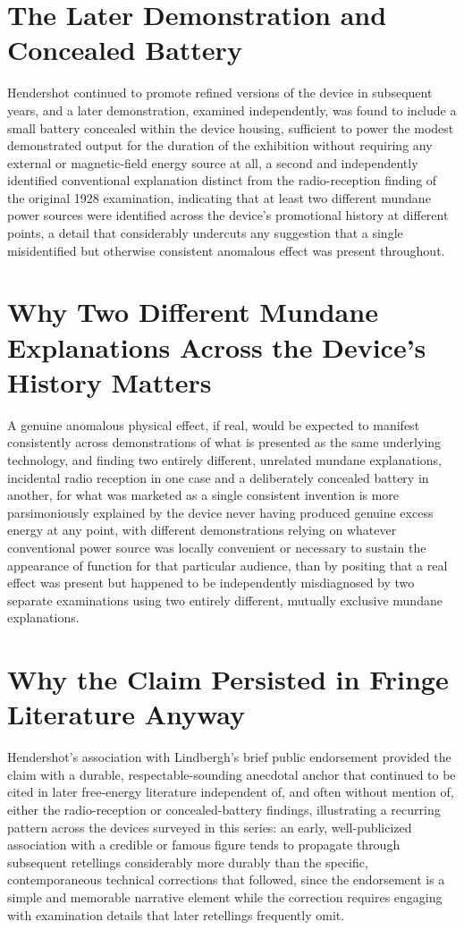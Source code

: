 \documentclass[11pt]{article}
\begin{document}
\section{The Later Demonstration and Concealed Battery}

Hendershot continued to promote refined versions of the device in subsequent years, and a later demonstration, examined independently, was found to include a small battery concealed within the device housing, sufficient to power the modest demonstrated output for the duration of the exhibition without requiring any external or magnetic-field energy source at all, a second and independently identified conventional explanation distinct from the radio-reception finding of the original 1928 examination, indicating that at least two different mundane power sources were identified across the device's promotional history at different points, a detail that considerably undercuts any suggestion that a single misidentified but otherwise consistent anomalous effect was present throughout.

\section{Why Two Different Mundane Explanations Across the Device's History Matters}

A genuine anomalous physical effect, if real, would be expected to manifest consistently across demonstrations of what is presented as the same underlying technology, and finding two entirely different, unrelated mundane explanations, incidental radio reception in one case and a deliberately concealed battery in another, for what was marketed as a single consistent invention is more parsimoniously explained by the device never having produced genuine excess energy at any point, with different demonstrations relying on whatever conventional power source was locally convenient or necessary to sustain the appearance of function for that particular audience, than by positing that a real effect was present but happened to be independently misdiagnosed by two separate examinations using two entirely different, mutually exclusive mundane explanations.

\section{Why the Claim Persisted in Fringe Literature Anyway}

Hendershot's association with Lindbergh's brief public endorsement provided the claim with a durable, respectable-sounding anecdotal anchor that continued to be cited in later free-energy literature independent of, and often without mention of, either the radio-reception or concealed-battery findings, illustrating a recurring pattern across the devices surveyed in this series: an early, well-publicized association with a credible or famous figure tends to propagate through subsequent retellings considerably more durably than the specific, contemporaneous technical corrections that followed, since the endorsement is a simple and memorable narrative element while the correction requires engaging with examination details that later retellings frequently omit.
\end{document}
